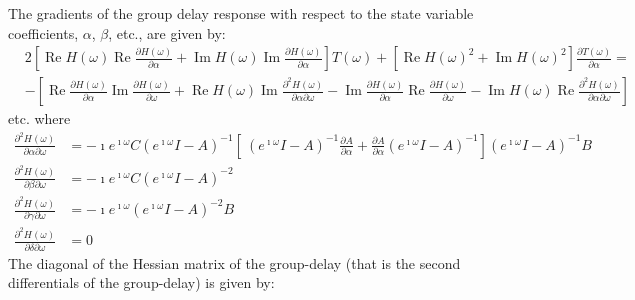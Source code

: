 \documentclass[a4paper,twoside,10pt,english]{report}
\begin{document}
The gradients of the group delay response with respect to the state
variable coefficients, $\alpha$, $\beta$, etc., are given by:
\begin{align*}
&2\left[\operatorname{Re}H\left(\omega\right)
\operatorname{Re}\frac{\partial{}H\left(\omega\right)}{\partial\alpha}+
\operatorname{Im}H\left(\omega\right)
\operatorname{Im}\frac{\partial{}H\left(\omega\right)}{\partial\alpha}\right]
T\left(\omega\right)+
\left[\operatorname{Re}H\left(\omega\right)^{2}+
\operatorname{Im}H\left(\omega\right)^{2}\right]
\frac{\partial{}T\left(\omega\right)}{\partial\alpha} = \\
&-\left[
\operatorname{Re}\frac{\partial{}H\left(\omega\right)}{\partial\alpha}
\operatorname{Im}\frac{\partial{}H\left(\omega\right)}{\partial\omega} +
\operatorname{Re}H\left(\omega\right)
\operatorname{Im}\frac{\partial^{2}H\left(\omega\right)}
{\partial\alpha\partial\omega} -
\operatorname{Im}\frac{\partial{}H\left(\omega\right)}{\partial\alpha}
\operatorname{Re}\frac{\partial{}H\left(\omega\right)}{\partial\omega} -
\operatorname{Im}H\left(\omega\right)
\operatorname{Re}\frac{\partial^{2}H\left(\omega\right)}
{\partial\alpha\partial\omega}
\right]
\end{align*}
etc. where
\begin{align*}
\frac{\partial^{2}H\left(\omega\right)}{\partial\alpha\partial{}\omega}&=
-\imath{}e^{\imath\omega}C\left(e^{\imath\omega}I-A\right)^{-1}\left[\
\left(e^{\imath\omega}I-A\right)^{-1}\frac{\partial{}A}{\partial\alpha}+
\frac{\partial{}A}{\partial\alpha}\left(e^{\imath\omega}I-A\right)^{-1}
\right]\left(e^{\imath\omega}I-A\right)^{-1}B\\
\frac{\partial^{2}H\left(\omega\right)}{\partial\beta\partial{}\omega}&=
-\imath{}e^{\imath\omega}C\left(e^{\imath\omega}I-A\right)^{-2}\\
\frac{\partial^{2}H\left(\omega\right)}{\partial\gamma\partial{}\omega}&=
-\imath{}e^{\imath\omega}\left(e^{\imath\omega}{}I-A\right)^{-2}B\\
\frac{\partial^{2}H\left(\omega\right)}{\partial\delta\partial{}\omega}&=0
\end{align*}
The diagonal of the Hessian matrix of the group-delay (that is the second
differentials of the group-delay) is given by:
\end{document}
